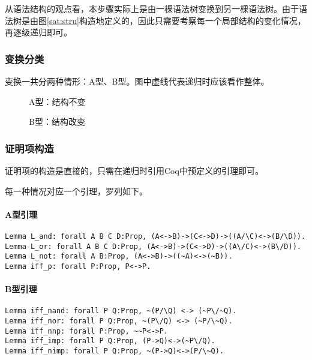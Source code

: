 从语法结构的观点看，本步骤实际上是由一棵语法树变换到另一棵语法树。由于语法树是由图\ref{sat:stru}构造地定义的，因此只需要考察每一个局部结构的变化情况，再逐级递归即可。

\subsubsection{变换分类}
变换一共分两种情形：A型、B型。图中虚线代表递归时应该看作整体。
\begin{figure}[!h]
\centering
{}
\caption{A型：结构不变}
\end{figure}

\begin{figure}[!h]
\centering
{}
\caption{B型：结构改变}
\end{figure}

\subsubsection{证明项构造}
证明项的构造是直接的，只需在递归时引用Coq中预定义的引理即可。

每一种情况对应一个引理，罗列如下。

\paragraph{A型引理}
\begin{verbatim}
Lemma L_and: forall A B C D:Prop, (A<->B)->(C<->D)->((A/\C)<->(B/\D)).
Lemma L_or: forall A B C D:Prop, (A<->B)->(C<->D)->((A\/C)<->(B\/D)).
Lemma L_not: forall A B:Prop, (A<->B)->((~A)<->(~B)).
Lemma iff_p: forall P:Prop, P<->P.
\end{verbatim}

\paragraph{B型引理}
\begin{verbatim}
Lemma iff_nand: forall P Q:Prop, ~(P/\Q) <-> (~P\/~Q).
Lemma iff_nor: forall P Q:Prop, ~(P\/Q) <-> (~P/\~Q).
Lemma iff_nnp: forall P:Prop, ~~P<->P.
Lemma iff_imp: forall P Q:Prop, (P->Q)<->(~P\/Q).
Lemma iff_nimp: forall P Q:Prop, ~(P->Q)<->(P/\~Q).
\end{verbatim}

